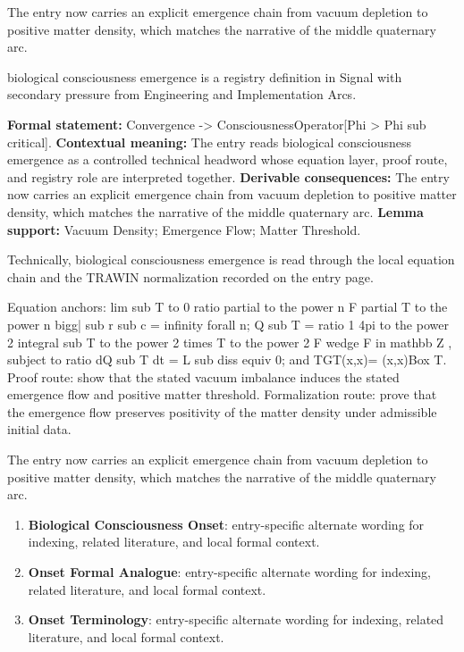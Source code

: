 The entry now carries an explicit emergence chain from vacuum depletion to positive matter density, which matches the narrative of the middle quaternary arc.
\clearpage


\begingroup\small
{}
biological consciousness emergence is a registry definition in Signal with secondary pressure from Engineering and Implementation Arcs.

\begingroup\footnotesize\setlength{\emergencystretch}{3em}\sloppy
\textbf{Formal statement:} Convergence -> ConsciousnessOperator[Phi > Phi sub critical]. \textbf{Contextual meaning:} The entry reads biological consciousness emergence as a controlled technical headword whose equation layer, proof route, and registry role are interpreted together. \textbf{Derivable consequences:} The entry now carries an explicit emergence chain from vacuum depletion to positive matter density, which matches the narrative of the middle quaternary arc. \textbf{Lemma support:} Vacuum Density; Emergence Flow; Matter Threshold.\par
\endgroup

Technically, biological consciousness emergence is read through the local equation chain and the TRAWIN normalization recorded on the entry page.

Equation anchors: lim sub T to 0 ratio partial to the power n F partial T to the power n bigg| sub r sub c = infinity forall n; Q sub T = ratio 1 4pi to the power 2 integral sub T to the power 2 times T to the power 2 F wedge F in mathbb Z , subject to ratio dQ sub T dt = L sub diss equiv 0; and TGT(x,x)= (x,x)Box  T. Proof route: show that the stated vacuum imbalance induces the stated emergence flow and positive matter threshold. Formalization route: prove that the emergence flow preserves positivity of the matter density under admissible initial data.

The entry now carries an explicit emergence chain from vacuum depletion to positive matter density, which matches the narrative of the middle quaternary arc.
\endgroup

\begin{enumerate}[leftmargin=1.6em,itemsep=6pt,topsep=4pt]
\item \textbf{Biological Consciousness Onset}: entry-specific alternate wording for indexing, related literature, and local formal context.
\item \textbf{Onset Formal Analogue}: entry-specific alternate wording for indexing, related literature, and local formal context.
\item \textbf{Onset Terminology}: entry-specific alternate wording for indexing, related literature, and local formal context.
\end{enumerate}


